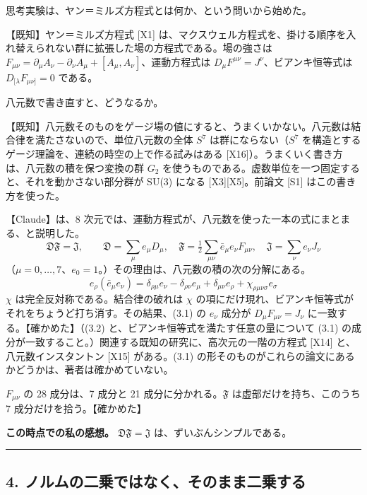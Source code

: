 \documentclass[
  a4paper,
]{ltjsarticle}
\begin{document}
思考実験は、ヤン＝ミルズ方程式とは何か、という問いから始めた。

【既知】ヤン＝ミルズ方程式 {[}X1{]}
は、マクスウェル方程式を、掛ける順序を入れ替えられない群に拡張した場の方程式である。場の強さは
\(F_{\mu\nu} = \partial_\mu A_\nu - \partial_\nu A_\mu + [A_\mu, A_\nu]\)、運動方程式は
\(D_\mu F^{\mu\nu} = J^\nu\)、ビアンキ恒等式は
\(D_{[\lambda}F_{\mu\nu]} = 0\) である。

八元数で書き直すと、どうなるか。

【既知】八元数そのものをゲージ場の値にすると、うまくいかない。八元数は結合律を満たさないので、単位八元数の全体
\(S^7\) は群にならない（\(S^7\)
を構造とするゲージ理論を、連続の時空の上で作る試みはある
{[}X16{]}）。うまくいく書き方は、八元数の積を保つ変換の群 \(G_2\)
を使うものである。虚数単位を一つ固定すると、それを動かさない部分群が
SU(3) になる {[}X3{]}{[}X5{]}。前論文 {[}S1{]} はこの書き方を使った。

【Claude】は、8
次元では、運動方程式が、八元数を使った一本の式にまとまる、と説明した。
\[
\mathfrak{D}\mathfrak{F} = \mathfrak{J},\qquad \mathfrak{D} = \sum_\mu e_\mu D_\mu,\quad \mathfrak{F} = \tfrac12\sum_{\mu\nu}\bar e_\mu e_\nu F_{\mu\nu},\quad \mathfrak{J} = \sum_\nu e_\nu J_\nu \tag{3.1}
\]
（\(\mu = 0, \dots, 7\)、\(e_0 = 1\)。）その理由は、八元数の積の次の分解にある。
\[
e_\rho(\bar e_\mu e_\nu) = \delta_{\rho\mu}e_\nu - \delta_{\rho\nu}e_\mu + \delta_{\mu\nu}e_\rho + \chi_{\rho\mu\nu\sigma}e_\sigma \tag{3.2}
\] \(\chi\) は完全反対称である。結合律の破れは \(\chi\)
の項にだけ現れ、ビアンキ恒等式がそれをちょうど打ち消す。その結果、(3.1)
の \(e_\nu\) 成分が \(D_\mu F_{\mu\nu} = J_\nu\)
に一致する。【確かめた】（(3.2)
と、ビアンキ恒等式を満たす任意の量について (3.1)
の成分が一致すること。）関連する既知の研究に、高次元の一階の方程式
{[}X14{]} と、八元数インスタントン {[}X15{]} がある。(3.1)
の形そのものがこれらの論文にあるかどうかは、著者は確かめていない。

\(F_{\mu\nu}\) の 28 成分は、7 成分と 21
成分に分かれる。\(\mathfrak{F}\) は虚部だけを持ち、このうち 7
成分だけを拾う。【確かめた】

\textbf{この時点での私の感想。}
\(\mathfrak{D}\mathfrak{F} = \mathfrak{J}\) は、ずいぶんシンプルである。

\begin{center}\rule{0.5\linewidth}{0.5pt}\end{center}

\subsection{4.
ノルムの二乗ではなく、そのまま二乗する}\label{ux30ceux30ebux30e0ux306eux4e8cux4e57ux3067ux306fux306aux304fux305dux306eux307eux307eux4e8cux4e57ux3059ux308b}
\end{document}
